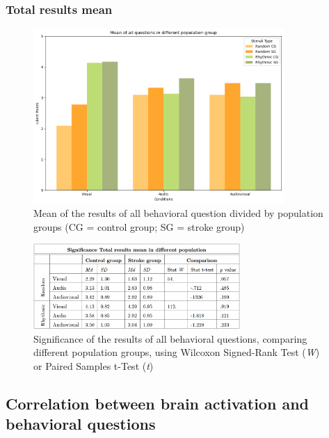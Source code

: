 \subsubsection*{Total results mean}
\begin{figure}[H]
    \centering
    \includegraphics[width=0.85\textwidth]{bar_plots/mean stroke and control.png}
    \caption{Mean of the results of all behavioral question divided by population groups (CG = control group; SG = stroke group)}
    \label{fig: mean_population_condition} 
\end{figure} 
\begin{figure}[H]
    \centering
    \includegraphics[width=0.70\textwidth]{significance_tables/tot_mean_pop.png}
    \caption{Significance of the results of all behavioral questions, comparing different population groups, using Wilcoxon Signed-Rank Test (\textit{W}) or Paired Samples t-Test (\textit{t})}
    \label{fig: significance_total_mean_pop} 
\end{figure} 

\clearpage
\subsection*{Correlation between brain activation and behavioral questions}
